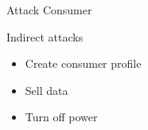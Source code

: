 \begin{frame}{Attack Consumer}
  \begin{block}{Indirect attacks}
    \begin{itemize}
      \item Create consumer profile
      \item Sell data
      \item Turn off power
    \end{itemize}
  \end{block}
\end{frame}
